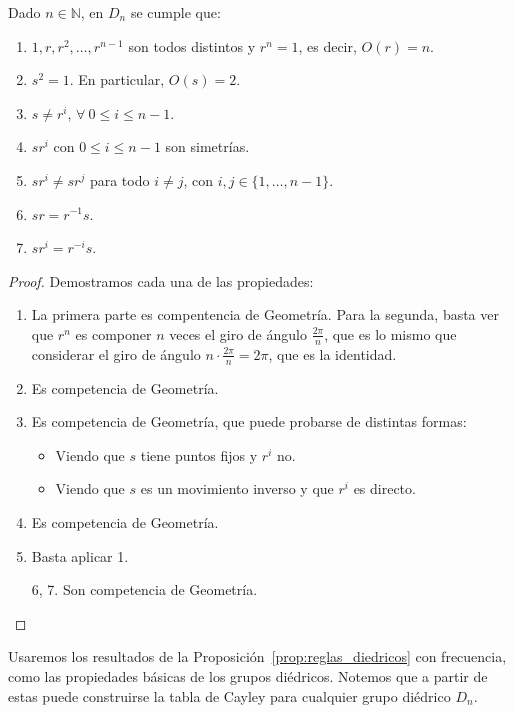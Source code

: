 \begin{prop}\label{prop:reglas_diedricos}
    Dado $n\in \mathbb{N}$, en $D_n$ se cumple que:
    \begin{enumerate}
        \item $1,r,r^2,\ldots,r^{n-1}$ son todos distintos y $r^n =1$, es decir, $O(r)=n$.
        \item $s^2 = 1$. En particular, $O(s) = 2$.
        \item $s\neq r^i$, $\forall\ 0 \leq i \leq n-1$.
        \item $sr^i$ con $0\leq i\leq n-1$ son simetrías. 
        \item $sr^i \neq sr^j$ para todo $i\neq j$, con $i,j \in \{1,\ldots,n-1\}$.
        \item $sr = r^{-1}s$.
        \item $sr^i = r^{-i}s$.
    \end{enumerate}
    \begin{proof}
        Demostramos cada una de las propiedades:
        \begin{enumerate}
            \item La primera parte es compentencia de Geometría. Para la segunda, basta ver que $r^n$ es componer $n$ veces el giro de ángulo $\frac{2\pi}{n}$, que es lo mismo que considerar el giro de ángulo $n\cdot \frac{2\pi}{n} = 2\pi$, que es la identidad.
            \item Es competencia de Geometría.
            \item Es competencia de Geometría, que puede probarse de distintas formas:
                \begin{itemize}
                    \item Viendo que $s$ tiene puntos fijos y $r^i$ no.
                    \item Viendo que $s$ es un movimiento inverso y que $r^i$ es directo.
                \end{itemize}
            \item Es competencia de Geometría.
            \item Basta aplicar 1.
            \item[6, 7.] Son competencia de Geometría.
        \end{enumerate}
    \end{proof}
\end{prop}

Usaremos los resultados de la Proposición~\ref{prop:reglas_diedricos} con frecuencia, como las propiedades básicas de los grupos diédricos. Notemos que a partir de estas puede construirse la tabla de Cayley para cualquier grupo diédrico $D_n$.

